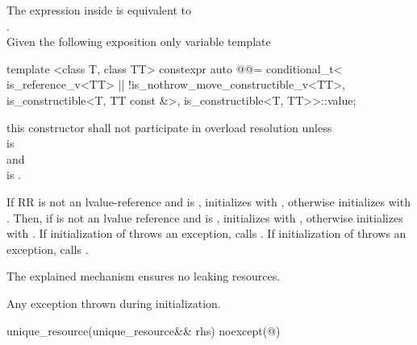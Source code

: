 \documentclass[ebook,11pt,article]{memoir}
\begin{document}
\begin{itemdescr}
\pnum
\remarks
The expression inside  is equivalent to \\
 \tcode{\&\&} .\\
Given the following exposition only variable template
\begin{codeblock}
template <class T, class TT>
constexpr auto @@=
  conditional_t<
    is_reference_v<TT> || !is_nothrow_move_constructible_v<TT>,
    is_constructible<T, TT const &>,
    is_constructible<T, TT>>::value;
\end{codeblock}
this constructor shall not participate in overload resolution unless
\\  is \\
and\\
 is .

\pnum
\effects If RR is not an lvalue-reference and  is , initializes  with , otherwise initializes  with . Then, if  is not an lvalue reference and  is , initializes   with , otherwise initializes  with . If initialization of  throws an exception, calls .  If initialization of  throws an exception, calls . 
\begin{note}
The explained mechanism ensures no leaking resources.
\end{note}

\pnum
\throws Any exception thrown during initialization.
\end{itemdescr}


\begin{itemdecl}
unique_resource(unique_resource&& rhs) noexcept(@\seebelow@)
\end{itemdecl}
\end{document}
